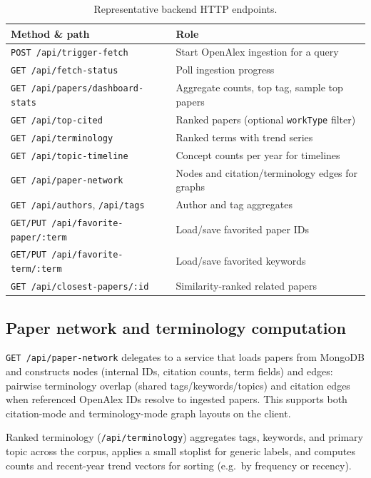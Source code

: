 \documentclass[sigconf]{acmart}
\begin{document}
\begin{table}[t]
  \centering
  \small
  \caption{Representative backend HTTP endpoints.}
  \label{tab:api}
  \begin{tabular}{@{}p{}p{}@{}}
    \toprule
    Method \& path & Role \\
    \midrule
    \texttt{POST /api/trigger-fetch} & Start OpenAlex ingestion for a query \\
    \texttt{GET /api/fetch-status} & Poll ingestion progress \\
    \texttt{GET /api/papers/dashboard-stats} & Aggregate counts, top tag, sample top papers \\
    \texttt{GET /api/top-cited} & Ranked papers (optional \texttt{workType} filter) \\
    \texttt{GET /api/terminology} & Ranked terms with trend series \\
    \texttt{GET /api/topic-timeline} & Concept counts per year for timelines \\
    \texttt{GET /api/paper-network} & Nodes and citation/terminology edges for graphs \\
    \texttt{GET /api/authors}, \texttt{/api/tags} & Author and tag aggregates \\
    \texttt{GET/PUT /api/favorite-paper/:term} & Load/save favorited paper IDs \\
    \texttt{GET/PUT /api/favorite-term/:term} & Load/save favorited keywords \\
    \texttt{GET /api/closest-papers/:id} & Similarity-ranked related papers \\
    \bottomrule
  \end{tabular}
\end{table}

\subsection{Paper network and terminology computation}
\texttt{GET /api/paper-network} delegates to a service that loads papers from MongoDB and constructs nodes (internal IDs, citation counts, term fields) and edges: pairwise terminology overlap (shared tags/keywords/topics) and citation edges when referenced OpenAlex IDs resolve to ingested papers. This supports both citation-mode and terminology-mode graph layouts on the client.

Ranked terminology (\texttt{/api/terminology}) aggregates tags, keywords, and primary topic across the corpus, applies a small stoplist for generic labels, and computes counts and recent-year trend vectors for sorting (e.g.\ by frequency or recency).
\end{document}

